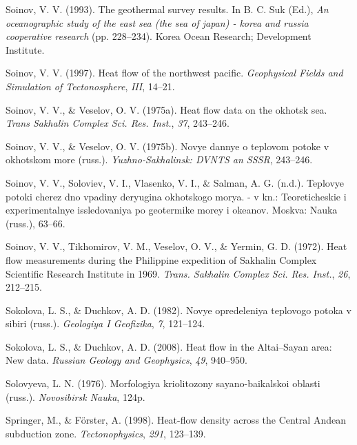 \documentclass[draft,linenumbers]{agujournal2018}
\begin{document}
\leavevmode{}%
Soinov, V. V. (1993). The geothermal survey results. In B. C. Suk (Ed.),
\emph{An oceanographic study of the east sea (the sea of japan) - korea
and russia cooperative research} (pp. 228--234). Korea Ocean Research;
Development Institute.

\leavevmode{}%
Soinov, V. V. (1997). Heat flow of the northwest pacific.
\emph{Geophysical Fields and Simulation of Tectonosphere}, \emph{III},
14--21.

\leavevmode{}%
Soinov, V. V., \& Veselov, O. V. (1975a). Heat flow data on the okhotsk
sea. \emph{Trans Sakhalin Complex Sci. Res. Inst.}, \emph{37}, 243--246.

\leavevmode{}%
Soinov, V. V., \& Veselov, O. V. (1975b). Novye dannye o teplovom potoke
v okhotskom more (russ.). \emph{Yuzhno-Sakhalinsk: DVNTS an SSSR},
243--246.

\leavevmode{}%
Soinov, V. V., Soloviev, V. I., Vlasenko, V. I., \& Salman, A. G.
(n.d.). Teplovye potoki cherez dno vpadiny deryugina okhotskogo morya. -
v kn.: Teoreticheskie i experimentalnye issledovaniya po geotermike
morey i okeanov. Moskva: Nauka (russ.), 63--66.

\leavevmode{}%
Soinov, V. V., Tikhomirov, V. M., Veselov, O. V., \& Yermin, G. D.
(1972). Heat flow measurements during the {Philippine} expedition of
{Sakhalin Complex Scientific Research Institute} in 1969. \emph{Trans.
Sakhalin Complex Sci. Res. Inst.}, \emph{26}, 212--215.

\leavevmode{}%
Sokolova, L. S., \& Duchkov, A. D. (1982). Novye opredeleniya teplovogo
potoka v sibiri (russ.). \emph{Geologiya I Geofizika}, \emph{7},
121--124.

\leavevmode{}%
Sokolova, L. S., \& Duchkov, A. D. (2008). Heat flow in the
{Altai--Sayan} area: New data. \emph{Russian Geology and Geophysics},
\emph{49}, 940--950.

\leavevmode{}%
Solovyeva, L. N. (1976). Morfologiya kriolitozony sayano-baikalskoi
oblasti (russ.). \emph{Novosibirsk Nauka}, 124p.

\leavevmode{}%
Springer, M., \& Förster, A. (1998). Heat-flow density across the
{Central Andean} subduction zone. \emph{Tectonophysics}, \emph{291},
123--139.
\end{document}

